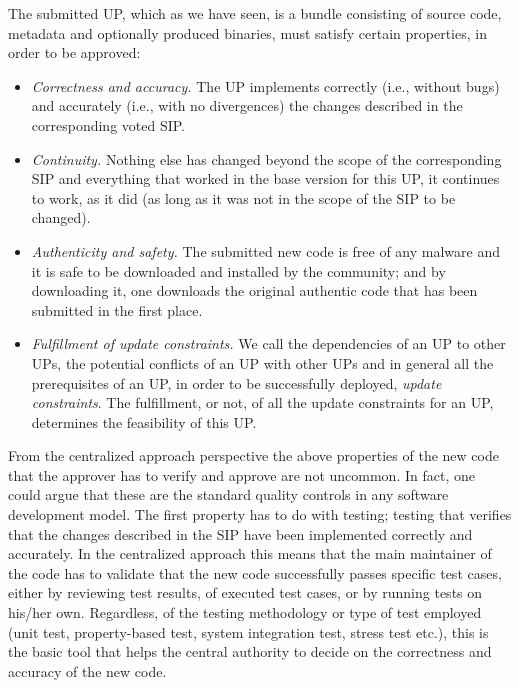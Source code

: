 The submitted UP, which as we have seen, is a bundle consisting of source code, metadata and optionally produced binaries, must satisfy certain properties, in order to be approved:
\begin{itemize}
\item
\emph{Correctness and accuracy.} The UP implements correctly (i.e., without bugs) and accurately (i.e., with no divergences) the changes described in the corresponding voted SIP.

\item \emph{Continuity.} Nothing else has changed beyond the scope of the corresponding SIP and everything that worked in the base version for this UP, it continues to work, as it did (as long as it was not in the scope of the SIP to be changed).

\item \emph{Authenticity and safety.} The submitted new code is free of any malware and it is safe to be downloaded and installed by the community; and by downloading it, one downloads the original authentic code that has been submitted in the first place.

\item \emph{Fulfillment of update constraints.} We call the dependencies of an UP to other UPs, the potential conflicts of an UP with other UPs and in general all the prerequisites of an UP, in order to be successfully deployed, \emph{update constraints}. The fulfillment, or not, of all the update constraints for an UP, determines the feasibility of this UP.
\end{itemize}


From the centralized approach perspective the above properties of the new code that the approver has to verify and approve are not uncommon. In fact, one could argue that these are the standard quality controls in any software development model. The first property has to do with testing; testing that verifies that the changes described in the SIP have been implemented correctly and accurately. In the centralized approach this means that the main maintainer of the code has to validate that the new code successfully passes specific test cases, either by reviewing test results, of executed test cases, or by running tests on his/her own. Regardless, of the testing methodology or type of test employed (unit test, property-based test, system integration test, stress test etc.), this is the basic tool that helps the central authority to decide on the correctness and accuracy of the new code. 

